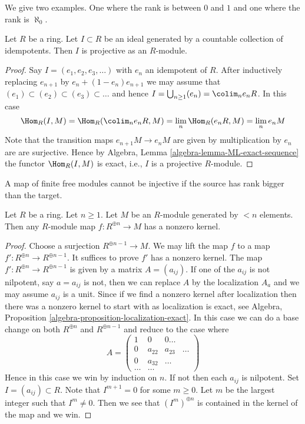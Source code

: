 \noindent
We give two examples. One where the rank is between $0$ and $1$
and one where the rank is $\aleph_0$.

\begin{lemma}
\label{lemma-ideal-generated-by-idempotents-projective}
Let $R$ be a ring. Let $I \subset R$ be an ideal generated by
a countable collection of idempotents. Then $I$ is projective
as an $R$-module.
\end{lemma}

\begin{proof}
Say $I = (e_1, e_2, e_3, \ldots)$ with $e_n$ an idempotent of $R$.
After inductively replacing $e_{n + 1}$ by $e_n + (1 - e_n)e_{n + 1}$
we may assume that $(e_1) \subset (e_2) \subset (e_3) \subset \ldots$
and hence $I = \bigcup_{n \geq 1} (e_n) = \colim_n e_nR$.
In this case
$$
\Hom_R(I, M) = \Hom_R(\colim_n e_nR, M)
= \lim_n \Hom_R(e_nR, M) = \lim_n e_nM
$$
Note that the transition maps $e_{n + 1}M \to e_nM$ are given
by multiplication by $e_n$ are are surjective. Hence by
Algebra, Lemma \ref{algebra-lemma-ML-exact-sequence}
the functor $\Hom_R(I, M)$ is exact, i.e., $I$ is a projective
$R$-module.
\end{proof}

\begin{lemma}
\label{lemma-map-cannot-be-injective}
\begin{slogan}
A map of finite free modules cannot be injective if the source has
rank bigger than the target.
\end{slogan}
Let $R$ be a ring. Let $n \geq 1$. Let $M$ be an $R$-module generated
by $< n$ elements. Then any $R$-module map $f : R^{\oplus n} \to M$ has a
nonzero kernel.
\end{lemma}

\begin{proof}
Choose a surjection $R^{\oplus n - 1} \to M$.
We may lift the map $f$ to a map $f' : R^{\oplus n} \to R^{\oplus n - 1}$.
It suffices to prove $f'$ has a nonzero kernel.
The map $f' : R^{\oplus n} \to R^{\oplus n - 1}$ is given by a
matrix $A = (a_{ij})$. If one of the $a_{ij}$ is not nilpotent, say
$a = a_{ij}$ is not, then we can replace $A$ by the localization $A_a$
and we may assume $a_{ij}$ is a unit. Since if we find a nonzero kernel
after localization then there was a nonzero kernel to start with as
localization is exact, see
Algebra, Proposition \ref{algebra-proposition-localization-exact}.
In this case we can do a base change on both $R^{\oplus n}$
and $R^{\oplus n - 1}$ and reduce to the case where
$$
A =
\left(
\begin{matrix}
1 & 0 & 0 \ldots \\
0 & a_{22} & a_{23} & \ldots \\
0 & a_{32} & \ldots \\
\ldots & \ldots
\end{matrix}
\right)
$$
Hence in this case we win by induction on $n$. If not then each
$a_{ij}$ is nilpotent. Set $I = (a_{ij}) \subset R$. Note that
$I^{m + 1} = 0$ for some $m \geq 0$. Let $m$ be the largest integer
such that $I^m \not = 0$. Then we see that $(I^m)^{\oplus n}$ is
contained in the kernel of the map and we win.
\end{proof}

